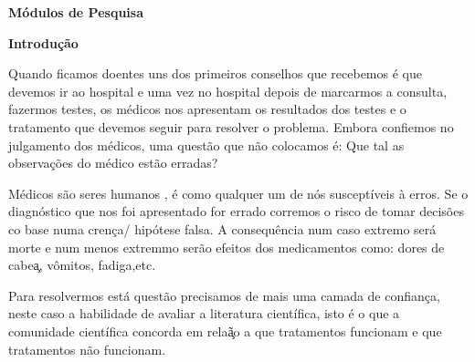 \documentclass[12pt]{article}
\begin{document}
 

\begin{titlepage}
    \begin{center}
        \Huge\textbf{M\'odulos de Pesquisa}
         
        \vspace{10cm}
    \end{center}
\end{titlepage}

\begin{center}
    \Huge\textbf{Introdu\c c\~ao}
\end{center}

Quando ficamos doentes uns dos primeiros conselhos que recebemos \'e que
devemos ir ao hospital e uma vez no hospital depois de marcarmos a consulta,
fazermos testes, os m\'edicos nos apresentam os resultados dos testes e o
tratamento que devemos seguir para resolver o problema.
Embora confiemos no julgamento dos m\'edicos, uma quest\~ao que n\~ao colocamos
\'e: Que tal as observa\c c\~oes do m\'edico est\~ao erradas?

M\'edicos s\~ao seres humanos , \'e como qualquer um de
n\'os suscept\'iveis \`a erros. Se o diagn\'ostico que nos foi apresentado for
errado corremos o risco de tomar decis\~oes co base numa cren\c ca/ hip\'otese
falsa.
A consequ\^encia num caso extremo ser\'a morte e num menos
extremmo ser\~ao efeitos dos medicamentos como: dores de cabe\c a, v\^omitos,
fadiga,etc.

Para resolvermos est\'a quest\~ao precisamos de mais uma camada de confian\c
ca, neste caso a habilidade de avaliar a literatura cient\'ifica, isto \'e o
que a comunidade cient\'ifica concorda em rela\c \~ao a que tratamentos
funcionam e que tratamentos n\~ao funcionam.

\end{document}

